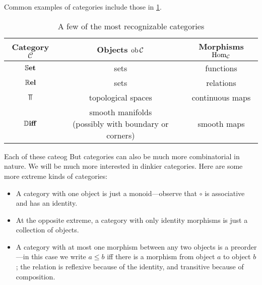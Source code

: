 Common examples of categories include those in \cref{tab:common-cats}.
\begin{table}
    \centering
    \begin{tabular}{ccc}\toprule
Category $\mathcal C$  & Objects $\operatorname{\mathop{\mathrm{ob}}} \mathcal C$  & Morphisms $\operatorname{\mathop{\mathrm{Hom}}}_{\mathcal C}$ \\ \midrule
$\mathbb{S}\mathbf{et}$ & sets & functions \\
$\mathbb{R}\mathbf{el}$ & sets & relations \\
$\Top$ & topological spaces & continuous maps \\
$\mathbb{D}\mathbf{iff}$ & \parbox{4cm}{smooth manifolds \\ (possibly with boundary or corners)} & smooth maps \\
\bottomrule
\end{tabular}
    \caption{A few of the most recognizable categories}
    \label{tab:common-cats}
\end{table}





Each of these cateog 
But categories can also be much more combinatorial in nature. 
We will be much more interested in dinkier categories.
Here are some more extreme kinds of categories:

\begin{itemize}[]
    \item A category with one object is just a monoid---observe that $\circ$ is associative and has an identity. 
    
    \item At the opposite extreme, a category with only identity morphisms is just a collection of objects. 
    
    \item A category with at most one morphism between any two objects is a preorder---in this case we write $a \le b$ iff there is a morphism from object $a$ to object $b$; the relation is reflexive because of the identity, and transitive because of composition. 
\end{itemize}

